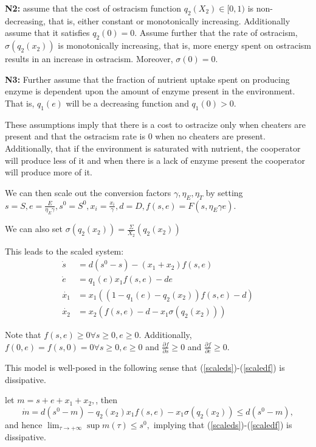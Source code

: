 \documentclass[12pt]{article}
\begin{document}
\noindent \textbf{N2: }  assume that the cost of ostracism function $q_2(X_2) \in [0,1)$ is non-decreasing, that is, either constant or monotonically increasing. Additionally assume that it satisfies $q_2(0)=0$. Assume further that the rate of ostracism, $\sigma(q_2(x_2))$ is monotonically increasing, that is, more energy spent on ostracism results in an increase in ostracism. Moreover, $\sigma(0)=0$. 

\noindent \textbf{N3: } Further assume that the fraction of nutrient uptake spent on producing enzyme is dependent upon the amount of enzyme present in the environment. That is, $q_1(e)$ will be a decreasing function and $q_1(0)>0$. 

These assumptions imply that there is a cost to ostracize only when cheaters are present and that the ostracism rate is 0 when no cheaters are present. Additionally, that if the environment is saturated with nutrient, the cooperator will produce less of it and when there is a lack of enzyme present the cooperator will produce more of it. 

\noindent We can then scale out the conversion factors $\gamma, \eta_E , \eta_T$ by setting $s=S, e=\frac{E}{\eta_E \gamma}, s^0=S^0, x_i=\frac{x_i}{\gamma}, d=D, f(s,e)=F(s,\eta_E \gamma e)$. 

\noindent We can also set $\sigma(q_2(x_2))= \frac{\Sigma}{X_2}(q_2(x_2))$

This leads to the scaled system: 
\begin{align}
\dot{s}&=d(s^0-s)-(x_1 + x_2) f(s,e) \label{scaleds}\\
\dot{e}&=q_1(e) x_1 f(s,e)-de\\
\dot{x_1} &= x_1((1-q_1(e)-q_2(x_2))f(s,e)-d)\\
\dot{x_2}&=x_2(f(s,e)-d-x_1 \sigma(q_2(x_2)))\label{scaledf}
\end{align}

\noindent Note that $f(s,e) \geq 0 \forall s \geq 0, e \geq 0.$ Additionally, $f(0,e)=f(s,0)=0 \forall s\geq 0, e\geq 0$ and $\frac{\partial f}{\partial s} \geq 0$ and $\frac{\partial f}{\partial e} \geq 0$.  

\noindent This model is well-posed in the following sense that (\ref{scaleds})-(\ref{scaledf}) is dissipative.

\noindent let $m=s+e+x_1+x_2,$, then $$\dot{m}=d(s^0-m)-q_2(x_2 )x_1 f(s,e)- x_1 \sigma(q_2(x_2)) \leq d(s^0-m),$$ and hence $\lim_{\tau \rightarrow +\infty} \sup m(\tau) \leq s^0,$ implying that (\ref{scaleds})-(\ref{scaledf}) is dissipative.
\end{document}
